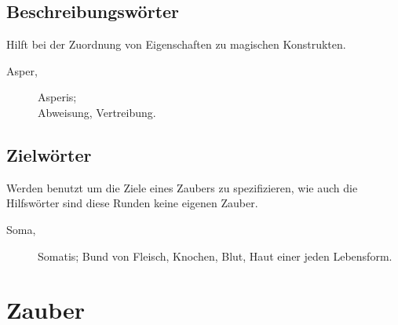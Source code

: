 \documentclass[a4paper,12pt,oneside]{book}
\begin{document}
\chapter{Beschreibungswörter}
Hilft bei der Zuordnung von Eigenschaften zu magischen Konstrukten.
\begin{description}
\item[Asper,]Asperis;
\\Abweisung, Vertreibung.
\end{description}

\chapter{Zielwörter}
Werden benutzt um die Ziele eines Zaubers zu spezifizieren, wie auch die Hilfswörter sind diese Runden keine eigenen Zauber.
\begin{description}
\item[Soma,]Somatis;
Bund von Fleisch, Knochen, Blut, Haut einer jeden Lebensform.
\end{description}


\part{Zauber}
\end{document}
